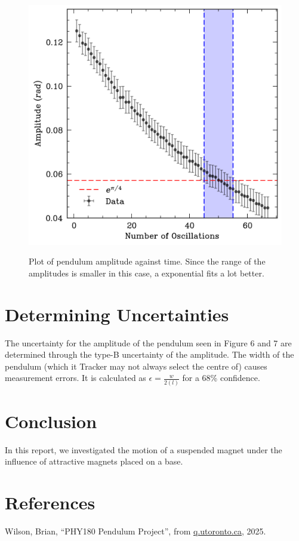 \documentclass[prl,twocolumn,amsmath,amssymb,superscriptaddress]{revtex4-2}
\begin{document}
\begin{figure}[htb]
    \includegraphics[width=0.8\linewidth]{count_decay.png}
    \label{fig:count_q}
    \caption{Plot of pendulum amplitude against time. Since the range of the amplitudes is smaller in this case, a exponential fits a lot better.}
\end{figure}


\section{Determining Uncertainties}

The uncertainty for the amplitude of the pendulum seen in Figure 6 and 7 are determined through the type-B uncertainty of the amplitude. The width of the pendulum (which it Tracker may not always select the centre of) causes measurement errors. It is calculated as $\epsilon = \frac{w}{2(l)}$ for a 68\% confidence.

\section{Conclusion}
In this report, we investigated the motion of a suspended magnet under the influence of attractive magnets placed on a base.


\onecolumngrid
\newpage

\section{References}

Wilson, Brian, “PHY180 Pendulum Project”, from
\href{https://q.utoronto.ca/courses/411727/files/39071655?module_item_id=7122439}{q.utoronto.ca}, 2025.
\end{document}
